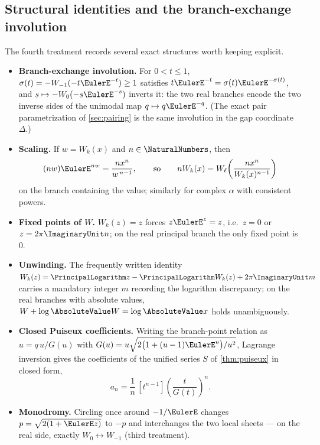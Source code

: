 \documentclass[11pt]{article}
\theoremstyle{remark}
\begin{document}
\subsection{Structural identities and the branch-exchange involution}

The fourth treatment records several exact structures worth keeping
explicit.

\begin{itemize}
\item\textbf{Branch-exchange involution.}  For \(0<t\le1\),
\(\sigma(t)=-W_{-1}(-t\EulerE^{-t})\ge1\) satisfies
\(t\EulerE^{-t}=\sigma(t)\EulerE^{-\sigma(t)}\), and
\(s\mapsto-W_0(-s\EulerE^{-s})\) inverts it: the two real branches encode the
two inverse sides of the unimodal map \(q\mapsto q\EulerE^{-q}\).  (The exact
pair parametrization of \cref{sec:pairing} is the same involution in the
gap coordinate \(\Delta\).)
\item\textbf{Scaling.}  If \(w=W_k(x)\) and \(n\in\NaturalNumbers\), then
\[
 (nw)\EulerE^{nw}=\frac{nx^n}{w^{\,n-1}},
 \qquad\text{so}\qquad
 nW_k(x)=W_\ell\!\left(\frac{nx^n}{W_k(x)^{n-1}}\right)
\]
on the branch containing the value; similarly for complex \(\alpha\) with
consistent powers.
\item\textbf{Fixed points of \(W\).}  \(W_k(z)=z\) forces \(z\EulerE^z=z\),
i.e.\ \(z=0\) or \(z=2\pi\ImaginaryUnit n\); on the real principal branch the only
fixed point is \(0\).
\item\textbf{Unwinding.}  The frequently written identity
\(W_k(z)=\PrincipalLogarithm z-\PrincipalLogarithm W_k(z)+2\pi\ImaginaryUnit m\) carries a mandatory integer \(m\)
recording the logarithm discrepancy; on the real branches with absolute
values, \(W+\log\AbsoluteValue W=\log\AbsoluteValue x\) holds unambiguously.
\item\textbf{Closed Puiseux coefficients.}  Writing the branch-point
relation as \(u=q\,u/G(u)\) with
\(G(u)=u\sqrt{2\bigl(1+(u-1)\EulerE^u\bigr)/u^2}\), Lagrange inversion gives
the coefficients of the unified series \(S\) of \cref{thm:puiseux} in
closed form,
\begin{equation}\label{cmp:eq:puiseux-lagrange}
 a_n=\frac1n\,[t^{n-1}]\left(\frac t{G(t)}\right)^{\!n}.
\end{equation}
\item\textbf{Monodromy.}  Circling once around \(-1/\EulerE\) changes
\(p=\sqrt{2(1+\EulerE z)}\) to \(-p\) and interchanges the two local sheets ---
on the real side, exactly \(W_0\leftrightarrow W_{-1}\) (third treatment).
\end{itemize}
\end{document}

